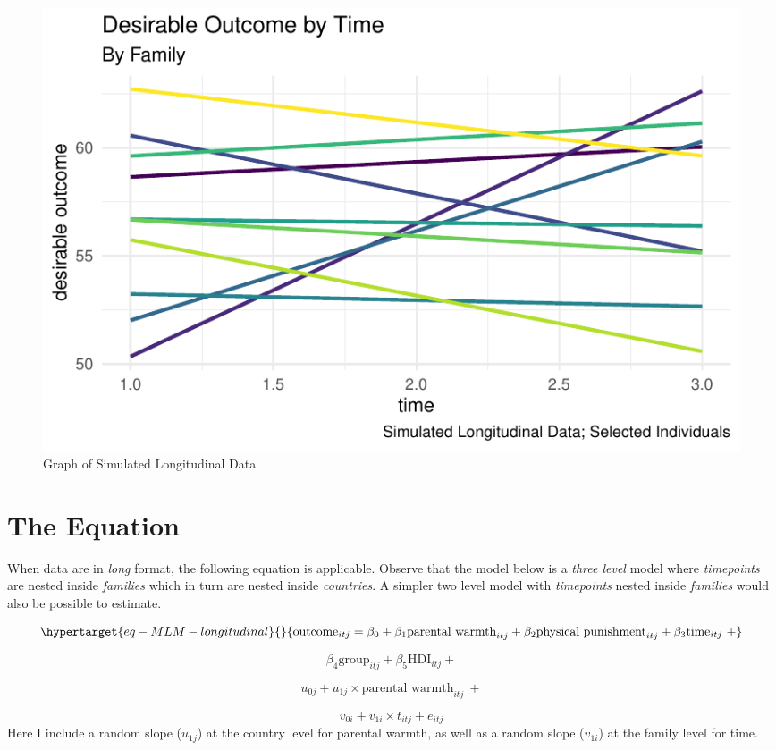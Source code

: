 \documentclass[
  letterpaper,
  DIV=11,
  numbers=noendperiod]{scrreprt}
\begin{document}
\begin{figure}

{\centering \includegraphics{longitudinal_files/figure-pdf/fig-data2-1.pdf}

}

\caption{\label{fig-data2}Graph of Simulated Longitudinal Data}

\end{figure}

\hypertarget{the-equation-1}{%
\section{The Equation}\label{the-equation-1}}

When data are in \emph{long} format, the following equation is
applicable. Observe that the model below is a \emph{three level} model
where \emph{timepoints} are nested inside \emph{families} which in turn
are nested inside \emph{countries}. A simpler two level model with
\emph{timepoints} nested inside \emph{families} would also be possible
to estimate.

\begin{equation}\protect\hypertarget{eq-MLM-longitudinal}{}{\text{outcome}_{itj} = \beta_0 + \beta_1 \text{parental warmth}_{itj} + \beta_2 \text{physical punishment}_{itj} + \beta_3 \text{time}_{itj} \ + }\label{eq-MLM-longitudinal}\end{equation}

\[\beta_4 \text{group}_{itj} + \beta_5 \text{HDI}_{itj} +\]

\[u_{0j} + u_{1j} \times \text{parental warmth}_{itj} \ + \]

\[v_{0i} + v_{1i} \times t_{itj} + e_{itj}\] Here I include a random
slope (\(u_{1j}\)) at the country level for parental warmth, as well as
a random slope (\(v_{1i}\)) at the family level for time.
\end{document}
